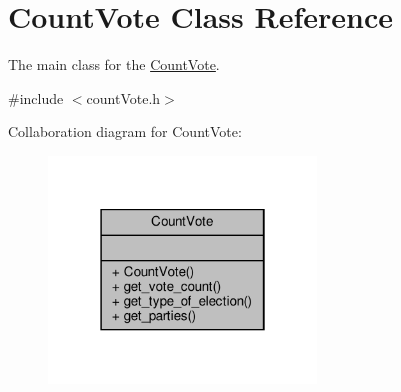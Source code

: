 \hypertarget{classCountVote}{}\section{Count\+Vote Class Reference}
\label{classCountVote}


The main class for the \hyperlink{classCountVote}{Count\+Vote}.  




{\ttfamily \#include $<$count\+Vote.\+h$>$}



Collaboration diagram for Count\+Vote\+:\nopagebreak
\begin{figure}[H]
\begin{center}
\leavevmode
\includegraphics[width=202pt]{classCountVote__coll__graph}
\end{center}
\end{figure}
